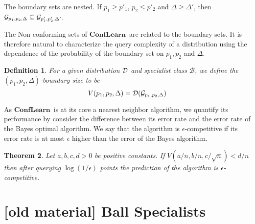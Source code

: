 \documentclass{article}
\newtheorem{theorem}{Theorem}[section]
\newtheorem{definition}[theorem]{Definition}
\newcommand{\D}{{\cal D}}
\newcommand{\cB}{\mathcal{B}}
\newcommand{\ActiveLearn}{\mathbf{ConfLearn}}
\begin{document}
The boundary sets are nested. If $p_1\geq p'_1$, $p_2 \leq p'_2$ and $\Delta \geq \Delta'$, then
$\mathcal{G}_{p_1,p_2,\Delta} \subseteq
\mathcal{G}_{p'_1,p'_2,\Delta'}$.

The Non-conforming sets of $\ActiveLearn$\ are related to the boundary
sets. It is therefore natural to characterize the query complexity of
a distribution using the dependence of the probability of the boundary
set on $p_1,p_2$ and $\Delta$.

\begin{definition}
  For a given distribution $\D$ and specialist class $\cB$, we define
  the $(p_1,p_2,\Delta)$-boundary size to be
  $$V(p_1,p_2,\Delta) =
  \D(\boundry{p_1,p_2,\Delta})$$
\end{definition}

As $\ActiveLearn$\ is at its core a nearest neighbor algorithm, we
quantify its performance by consider the difference between its error
rate and the error rate of the Bayes optimal
algorithm. We say that the algorithm is $\epsilon$-competitive if its
error rate is at most $\epsilon$ higher than the error of the Bayes algorithm.

\begin{theorem}
Let $a,b,c,d>0$ be positive constants. If $V(a/n,b/n,c/\sqrt{n}) <
d/n$ then after querying $\log(1/\epsilon)$ points the prediction of
the algorithm is $\epsilon$-competitive.
\end{theorem}

\section{\color{red} [old material] Ball Specialists}
\end{document}
